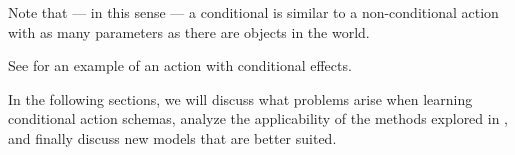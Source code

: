 \documentclass[../Master.tex]{subfiles}
\begin{document}
Note that --- in this sense --- a conditional is similar to a non-conditional action with as many parameters as there are objects in the world. 

See  for an example of an action with conditional effects. 

In the following sections, we will discuss what problems arise when learning conditional action schemas, analyze the applicability of the methods explored in , and finally discuss new models that are better suited.
\end{document}
